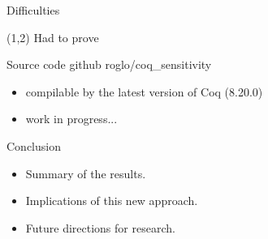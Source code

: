 \documentclass{beamer}
\begin{document}
\begin{frame}{Difficulties}
  \begin{textblock}{10}(1,2)
    Had to prove
  \end{textblock}
\end{frame}

\begin{frame}{Source code}
  github \: roglo/coq\_sensitivity \\
  \begin{itemize}
  \item compilable by the latest version of Coq (8.20.0)
  \item work in progress...
  \end{itemize}
\end{frame}

\begin{frame}{Conclusion}
    \begin{itemize}
        \item Summary of the results.
        \item Implications of this new approach.
        \item Future directions for research.
    \end{itemize}
\end{frame}
\end{document}
